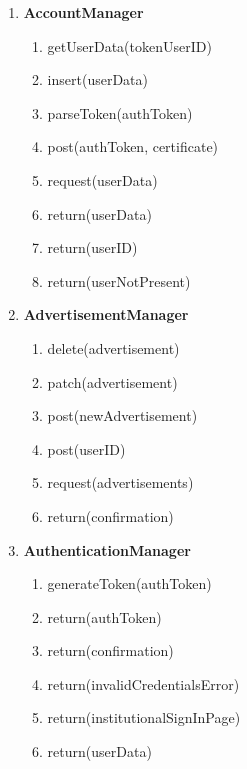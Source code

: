 \begin{enumerate}
    \item \textbf{AccountManager}
    \begin{enumerate}
        \item getUserData(tokenUserID)
        \item insert(userData)
        \item parseToken(authToken)
        \item post(authToken, certificate)
        \item request(userData)
        \item return(userData)
        \item return(userID)
        \item return(userNotPresent)
    \end{enumerate}
    \item \textbf{AdvertisementManager}
    \begin{enumerate}
        \item delete(advertisement)
        \item patch(advertisement)
        \item post(newAdvertisement)
        \item post(userID)
        \item request(advertisements)
        \item return(confirmation)

    \end{enumerate}
    \item \textbf{AuthenticationManager}
    \begin{enumerate}
        \item generateToken(authToken)
        \item return(authToken)
        \item return(confirmation)
        \item return(invalidCredentialsError)
        \item return(institutionalSignInPage)
        \item return(userData)


\end{enumerate}
\end{enumerate}
